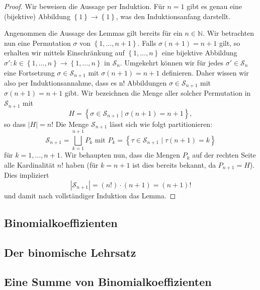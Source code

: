 \documentclass[../Analysis1_script.tex]{subfiles}
\begin{document}
\begin{proof}
	Wir beweisen die Aussage per Induktion. Für $n=1$ gibt es genau eine (bijektive) Abbildung $\left \lbrace {1} \right \rbrace \to \left \lbrace {1} \right \rbrace$, was den Induktionsanfang darstellt. 
	
	Angenommen die Aussage des Lemmas gilt bereits für ein $n\in \mathbb {N}$. Wir betrachten nun eine Permutation $\sigma$ von $\left \lbrace {1,\ldots ,n+1} \right \rbrace$. Falls $\sigma (n+1) = n+1$ gilt, so erhalten wir mittels Einschränkung auf $\left \lbrace {1,\ldots ,n} \right \rbrace$ eine bijektive Abbildung $\sigma ': k \in \left \lbrace {1,\ldots ,n} \right \rbrace \to \left \lbrace {1,\ldots ,n} \right \rbrace$ in $\mathcal {S}_n$. Umgekehrt können wir für jedes $\sigma '\in \mathcal {S}_n$ eine Fortsetzung $\sigma \in \mathcal {S}_{n+1}$ mit $\sigma (n+1)=n+1$ definieren. Daher wissen wir also per Induktionsannahme, dass es n! Abbildungen $\sigma \in \mathcal {S}_{n+1}$ mit $\sigma (n+1)=n+1$ gibt. Wir bezeichnen die Menge aller solcher Permutation in $\mathcal {S}_{n+1}$ mit 
	\[H=\left \lbrace {\sigma \in \mathcal {S}_{n+1}} \mid {\sigma (n+1)=n+1}\right \rbrace ,\]
	so dass $|H|=n!$
	Die Menge $\mathcal {S}_{n+1}$ lässt sich wie folgt partitionieren:
	 \[\mathcal {S}_{n+1} = \bigsqcup _{k=1}^{n+1}P_k\text { mit } P_k=\left \lbrace {\tau \in \mathcal {S}_{n+1}} \mid {\tau (n+1) = k}\right \rbrace\]
für $k=1,\ldots ,n+1$. Wir behaupten nun, dass die Mengen $P_k$ auf der rechten Seite alle Kardinalität $n!$ haben (für $k=n+1$ ist dies bereits bekannt, da $P_{n+1}=H$). Dies impliziert 
	 \[|\mathcal {S}_{n+1}| = (n!)\cdot (n+1) = (n+1)!\]
und damit nach vollständiger Induktion das Lemma.
\end{proof}

\subsection{Binomialkoeffizienten}

\subsection{Der binomische Lehrsatz}

\subsection{Eine Summe von Binomialkoeffizienten}
\end{document}
